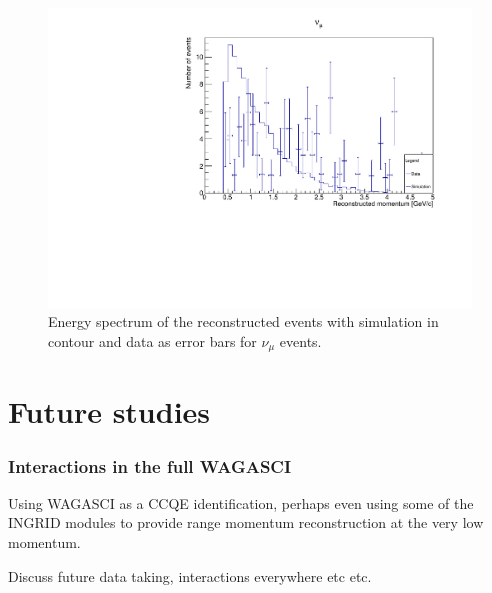 \begin{figure}[h!]
\centering
\includegraphics[width=.9\textwidth]{figures/NeutrinoChap/nuEventNew.pdf}
\caption{Energy spectrum of the reconstructed events with simulation in contour and data as error bars for $\nu_\mu$ events.}
\label{fig:datanumu}
\end{figure}



\pagebreak
\section{Future studies}

\subsubsection{Interactions in the full WAGASCI}

Using WAGASCI as a CCQE identification, perhaps even using some of the INGRID modules to provide range momentum reconstruction at the very low momentum.










Discuss future data taking, interactions everywhere etc etc.

